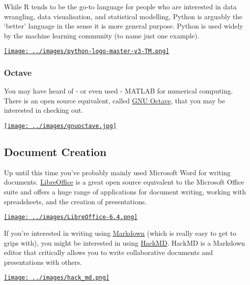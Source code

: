 \documentclass[
]{book}
\begin{document}
While R tends to be the go-to language for people who are interested in data wrangling, data visualisation, and statistical modelling, Python is arguably the `better' language in the sense it is more general purpose. Python is used widely by the machine learning community (to name just one example).

\href{https://www.python.org}{\texttt{[image: ../images/python-logo-master-v3-TM.png]}}

\hypertarget{octave}{%
\subsubsection*{Octave}\label{octave}}

You may have heard of - or even used - MATLAB for numerical computing. There is an open source equivalent, called \href{https://www.gnu.org/software/octave/}{GNU Octave}, that you may be interested in checking out.

\href{https://www.gnu.org/software/octave/}{\texttt{[image: ../images/gnuoctave.jpg]}}

\hypertarget{document-creation}{%
\subsection{Document Creation}\label{document-creation}}

Up until this time you've probably mainly used Microsoft Word for writing documents. \href{https://www.libreoffice.org}{LibreOffice} is a great open source equivalent to the Microsoft Office suite and offers a huge range of applications for document writing, working with spreadsheets, and the creation of presentations.

\href{https://www.libreoffice.org}{\texttt{[image: ../images/LibreOffice-6.4.png]}}

If you're interested in writing using \href{https://www.markdownguide.org}{Markdown} (which is really easy to get to grips with), you might be interested in using \href{https://opensource.com/article/19/7/enable-collaboration-hackmd}{HackMD}. HackMD is a Markdown editor that critically allows you to write collaborative documents and presentations with others.

\href{https://opensource.com/article/19/7/enable-collaboration-hackmd}{\texttt{[image: ../images/hack\_md.png]}}
\end{document}
